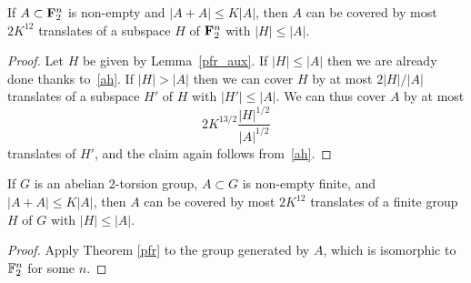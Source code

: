 \begin{theorem}[PFR]\label{pfr}
\leanok
If $A \subset {\bf F}_2^n$ is non-empty and $|A+A| \leq K|A|$, then $A$ can be covered by most $2K^{12}$ translates of a subspace $H$ of ${\bf F}_2^n$ with $|H| \leq |A|$.
\end{theorem}

\begin{proof}
  \leanok
  Let $H$ be given by Lemma~\ref{pfr_aux}.
  If $|H| \leq |A|$ then we are already done thanks to~\eqref{ah}.  If $|H| > |A|$ then we can cover $H$ by at most $2 |H|/|A|$ translates of a subspace $H'$ of $H$ with $|H'| \leq |A|$.  We can thus cover $A$ by at most
  \[2K^{13/2} \frac{|H|^{1/2}}{|A|^{1/2}}\]
  translates of $H'$, and the claim again follows from~\eqref{ah}.
\end{proof}

\begin{corollary}\label{pfr-cor}
  \leanok
  If $G$ is an abelian $2$-torsion group, $A \subset G$ is non-empty finite, and $|A+A| \leq K|A|
  $, then $A$ can be covered by most $2K^{12}$ translates of a finite group  $H$ of $G$ with $|H| \leq |A|$.
  \end{corollary}

\begin{proof}\leanok  Apply Theorem \ref{pfr} to the group generated by $A$, which is isomorphic to $\mathbb{F}_2^n$ for some $n$.
\end{proof}
